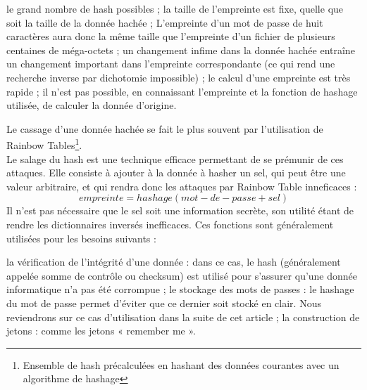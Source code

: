 \begin{itemize}
	\begin{itemize}
		\itemtirait le grand nombre de hash possibles ;
		\itemtirait la taille de l’empreinte est fixe, quelle que soit la taille de la donnée hachée ;
		\itemtirait L’empreinte d’un mot de passe de huit caractères aura donc la même taille que l’empreinte d’un fichier de plusieurs centaines de méga-octets ;
		\itemtirait un changement infime dans la donnée hachée entraîne un changement important dans l’empreinte correspondante (ce qui rend une recherche inverse par dichotomie impossible) ;
		\itemtirait le calcul d’une empreinte est très rapide ;
		\itemtirait il n’est pas possible, en connaissant l’empreinte et la fonction de hashage utilisée, de calculer la donnée d’origine.
	\end{itemize}
	Le cassage d’une donnée hachée se fait le plus souvent par l’utilisation de Rainbow Tables\footnote{Ensemble de hash précalculées en hashant des données courantes avec un algorithme de hashage}.\\
	Le salage du hash est une technique efficace permettant de se prémunir de ces attaques. Elle consiste à ajouter à la donnée à hasher un sel, qui peut être une valeur arbitraire, et qui rendra donc les attaques par Rainbow Table inneficaces : \\
	\begin{equation}
	empreinte = hashage(mot-de-passe + sel)
	\end{equation}
	Il n’est pas nécessaire que le sel soit une information secrète, son utilité étant de rendre les dictionnaires inversés inefficaces.
	Ces fonctions sont généralement utilisées pour les besoins suivants :
	\begin{itemize}
		\itemcheck la vérification de l’intégrité d’une donnée : dans ce cas, le hash (généralement appelée somme de contrôle ou checksum) est utilisé pour s’assurer qu’une donnée informatique n’a pas été corrompue ;
		\itemcheck le stockage des mots de passes : le hashage du mot de passe permet d’éviter que ce dernier soit stocké en clair. Nous reviendrons sur ce cas d’utilisation dans la suite de cet article ;
		\itemcheck la construction de jetons : comme les jetons « remember me ».
	\end{itemize}
	\begin{comment}
	Il existe différents algorithmes de hashage :
	MD5 (Message Digest 5) : probablement le plus connu, il est souvent utilisé pour les sommes de contrôle ou le stockage de mot de passes (notamment dans sa version salée dans diverses distributions Linux). Son empreinte est représentée sur 128 bits. Actuellement, le MD5 est mis de côté au profit des algorithmes SHA1 et SHA256 réputés plus sûrs.

\end{comment}
\end{itemize}
